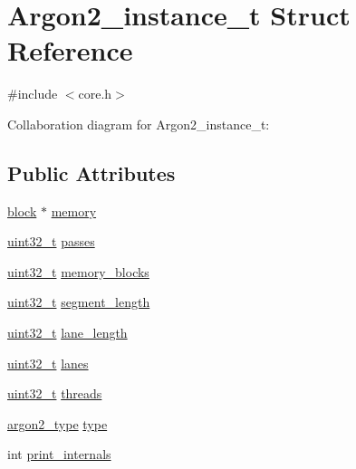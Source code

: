 \hypertarget{struct_argon2__instance__t}{}\section{Argon2\+\_\+instance\+\_\+t Struct Reference}
\label{struct_argon2__instance__t}


{\ttfamily \#include $<$core.\+h$>$}



Collaboration diagram for Argon2\+\_\+instance\+\_\+t\+:
\subsection*{Public Attributes}
\begin{DoxyCompactItemize}
\item 
\hyperlink{core_8h_ace80c27428e237fe24f54ae915a36133}{block} $\ast$ \hyperlink{struct_argon2__instance__t_a7feaf5341041e1c7aca88eb093ad67a3}{memory}
\item 
\hyperlink{stdint_8h_a435d1572bf3f880d55459d9805097f62}{uint32\+\_\+t} \hyperlink{struct_argon2__instance__t_a2783db68ff7f7801616f7c78e319ffd5}{passes}
\item 
\hyperlink{stdint_8h_a435d1572bf3f880d55459d9805097f62}{uint32\+\_\+t} \hyperlink{struct_argon2__instance__t_a40e32466250c3eaa25458b89050f1d0d}{memory\+\_\+blocks}
\item 
\hyperlink{stdint_8h_a435d1572bf3f880d55459d9805097f62}{uint32\+\_\+t} \hyperlink{struct_argon2__instance__t_a027cbd7a67c433446811f3c0f00099be}{segment\+\_\+length}
\item 
\hyperlink{stdint_8h_a435d1572bf3f880d55459d9805097f62}{uint32\+\_\+t} \hyperlink{struct_argon2__instance__t_a91274f0e1d85a39d29d7ab90a44e4c79}{lane\+\_\+length}
\item 
\hyperlink{stdint_8h_a435d1572bf3f880d55459d9805097f62}{uint32\+\_\+t} \hyperlink{struct_argon2__instance__t_ad2f436030b823c86269c589d6a923120}{lanes}
\item 
\hyperlink{stdint_8h_a435d1572bf3f880d55459d9805097f62}{uint32\+\_\+t} \hyperlink{struct_argon2__instance__t_ae44c8933040075bc8b4fc3d15b170a2f}{threads}
\item 
\hyperlink{argon2_8h_af51eac9927f7f234943d076166aacf84}{argon2\+\_\+type} \hyperlink{struct_argon2__instance__t_a5632fb070b91ef79ed3a7f915b032d90}{type}
\item 
int \hyperlink{struct_argon2__instance__t_a475fcf721a2e26d5239b21eb5fd01375}{print\+\_\+internals}
\end{DoxyCompactItemize}


